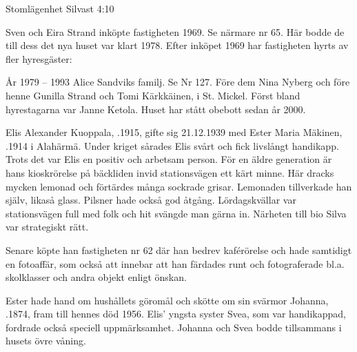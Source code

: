 Stomlägenhet Silvast 4:10

Sven och Eira Strand inköpte fastigheten 1969. Se närmare nr 65. Här bodde de till dess det nya huset var klart 1978. Efter inköpet 1969 har fastigheten hyrts av fler hyresgäster:

År 1979 – 1993  Alice Sandviks familj. Se Nr 127. Före dem Nina Nyberg och före henne Gunilla Strand och Tomi Kärkkäinen,  i St. Mickel. Först bland hyrestagarna var Janne Ketola. Huset har stått obebott sedan år 2000.



Elis Alexander Kuoppala, .1915, gifte sig 21.12.1939 med Ester Maria Mäkinen, .1914 i Alahärmä. Under kriget sårades Elis svårt och fick livslångt handikapp. Trots det var Elis en positiv och arbetsam person. För en äldre generation är hans kioskrörelse på bäckliden invid stationsvägen ett kärt minne. Här dracks mycken lemonad och förtärdes många sockrade grisar. Lemonaden tillverkade han själv, likaså glass. Pilsner hade också god åtgång. Lördagskvällar var stationsvägen full med folk och hit svängde man gärna in. Närheten till bio Silva var strategiskt rätt.

Senare köpte han fastigheten nr 62 där han bedrev kaférörelse och hade samtidigt en fotoaffär, som också att innebar att han färdades runt och fotograferade bl.a. skolklasser och andra objekt enligt önskan.

Ester hade hand om hushållets göromål och skötte om sin svärmor Johanna, .1874, fram till hennes död 1956. Elis' yngsta syster Svea, som var handikappad, fordrade också speciell uppmärksamhet. Johanna och Svea bodde tillsammans i husets övre våning.
\begin{jhchildren}
  \item {}
  \item {}
\end{jhchildren}


